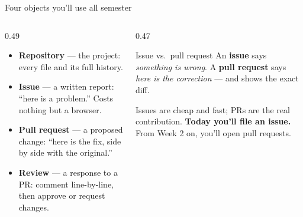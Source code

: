 \documentclass[9pt,aspectratio=169]{beamer}
\begin{document}
\begin{frame}{Four objects you'll use all semester}
    \begin{columns}[T]
        \begin{column}{0.49\textwidth}
            \begin{itemize}
                \item \textcolor{tab-blue}{\textbf{Repository}} --- the project: every file and its full history.
                \vspace{0.3em}
                \item \textcolor{tab-green}{\textbf{Issue}} --- a written report: ``here is a problem.'' Costs nothing but a browser.
                \vspace{0.3em}
                \item \textcolor{tab-orange}{\textbf{Pull request}} --- a proposed change: ``here is the fix, side by side with the original.''
                \vspace{0.3em}
                \item \textcolor{tab-purple}{\textbf{Review}} --- a response to a PR: comment line-by-line, then approve or request changes.
            \end{itemize}
        \end{column}
        \begin{column}{0.47\textwidth}
            \begin{block}{Issue vs.\ pull request}
                \footnotesize An \textbf{issue} says \textit{something is wrong}. A \textbf{pull request} says \textit{here is the correction} --- and shows the exact diff.
                \vspace{0.3em}

                Issues are cheap and fast; PRs are the real contribution. \textbf{Today you'll file an issue.} From Week 2 on, you'll open pull requests.
            \end{block}
        \end{column}
    \end{columns}
\end{frame}
\end{document}
